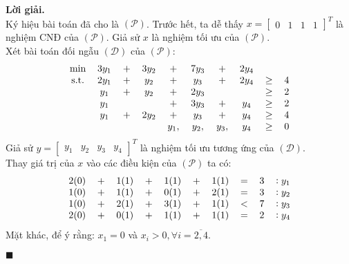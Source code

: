\documentclass[12pt]{article}
\newenvironment{solution}{%
     \setlength\parindent{0pt}\par\medskip\textbf{Lời giải.}\quad}{%
     \hfill\tiny$\blacksquare$\par\medskip}
\begin{document}
    \begin{solution}
        \\
        Ký hiệu bài toán đã cho là $(\mathcal{P})$. Trước hết, ta dễ thấy $x = \begin{bmatrix} 0 & 1 & 1 & 1 \end{bmatrix}^T$ là nghiệm CNĐ của $(\mathcal{P})$. Giả sử $x$ là nghiệm tối ưu của $(\mathcal{P})$.
        \\
        Xét bài toán đối ngẫu $(\mathcal{D})$ của $(\mathcal{P})$:
        \begin{align*}
            \begin{tabular}{cccccccccc}
                \text{min} & $3y_1$ & $+$ & $3y_2$ & $+$ & $7y_3$ & $+$ & $2y_4$ \\
                \text{s.t.} & $2y_1$ & $+$ & $y_2$ & $+$ & $y_3$ & $+$ & $2y_4$ & $\geq$ & 4 \\
                & $y_1$ & $+$ & $y_2$ & $+$ & $2y_3$ & & & $\geq$ & 2 \\
                & $y_1$ & & & $+$ & $3y_3$ & $+$ & $y_4$ & $\geq$ & 2 \\
                & $y_1$ & $+$ & $2y_2$ & $+$ & $y_3$ & $+$ & $y_4$ & $\geq$ & 4\\
                & & & & $y_1,$ & $y_2,$ & $y_3,$ & $y_4$ & $\geq$ & 0
            \end{tabular}
        \end{align*}
        Giả sử $y = \begin{bmatrix} y_1 & y_2 & y_3 & y_4 \end{bmatrix}^T$ là nghiệm tối ưu tương ứng của $(\mathcal{D})$.
        \\
        Thay giá trị của $x$ vào các điều kiện của $(\mathcal{P})$ ta có:
        \begin{align*}
            \begin{tabular}{ccccccccccc}
                $2(0)$ & $+$ & $1(1)$ & $+$ & $1(1)$ & $+$ & $1(1)$ & $=$ & 3 & $:y_1$\\
                $1(0)$ & $+$ & $1(1)$ & $+$ & $0(1)$ & $+$ & $2(1)$ & $=$ & 3 & $:y_2$\\
                $1(0)$ & $+$ & $2(1)$ & $+$ & $3(1)$ & $+$ & $1(1)$ & $<$ & 7 & $:y_3$\\
                $2(0)$ & $+$ & $0(1)$ & $+$ & $1(1)$ & $+$ & $1(1)$ & $=$ & 2 & $:y_4$
            \end{tabular}
        \end{align*}
        Mặt khác, để ý rằng: $x_1 = 0$ và $x_i > 0, \forall i = \overline{2,4}$. 

\end{solution}
\end{document}
